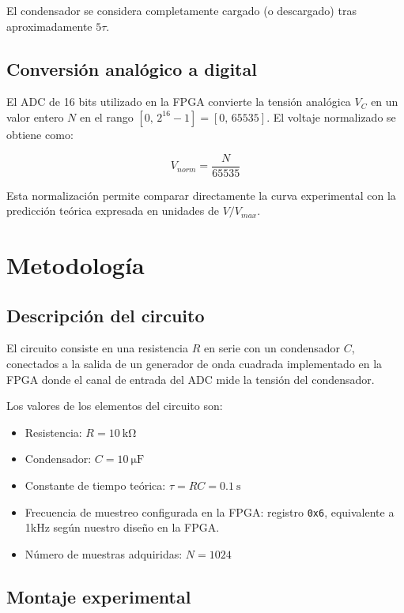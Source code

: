 \documentclass[conference]{IEEEtran}
\begin{document}
El condensador se considera completamente cargado (o descargado) tras aproximadamente $5\tau$.

\subsection{Conversión analógico a digital}

El ADC de 16 bits utilizado en la FPGA convierte la tensión analógica $V_C$ en un valor entero $N$ en el rango $[0,\, 2^{16}-1] = [0,\, 65535]$. El voltaje normalizado se obtiene como:

\begin{equation}
    V_{norm} = \frac{N}{65535}
    \label{eq:norm}
\end{equation}

Esta normalización permite comparar directamente la curva experimental con la predicción teórica expresada en unidades de $V/V_{max}$.

\section{Metodología}

\subsection{Descripción del circuito}

El circuito consiste en una resistencia $R$ en serie con un condensador $C$, conectados a la salida de un generador de onda cuadrada implementado en la FPGA donde el canal de entrada del ADC mide la tensión del condensador.

Los valores de los elementos del circuito son:

\begin{itemize}
    \item Resistencia: $R = \SI{10}{\kilo\ohm}$
    \item Condensador: $C = \SI{10}{\micro\farad}$
    \item Constante de tiempo teórica: $\tau = RC = \SI{0.1}{\second}$
    \item Frecuencia de muestreo configurada en la FPGA: registro \texttt{0x6}, equivalente a 1kHz según nuestro diseño en la FPGA.
    \item Número de muestras adquiridas: $N = 1024$
\end{itemize}

\subsection{Montaje experimental}
\label{subsec:montaje}
\end{document}
